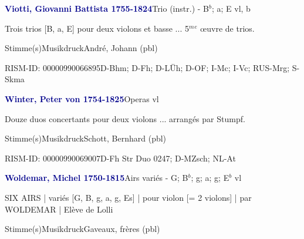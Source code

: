 \documentclass[twocolumn]{book}
\begin{document}
\par \vspace{7pt} \textcolor{darkblue}{\textbf{Viotti, Giovanni Battista  1755-1824}}\hfillplus{\textbf{[340]}}\newline Trio (instr.) - B$^b$; a; E vl, b
\par \begin{itshape}Trois trios [B, a, E] pour deux violons et basse ... 5$^m$$^e$ œuvre de trios.\end{itshape} 
\par \textcolor{darkblue}{}  Stimme(s)\newline Musikdruck\newline André, Johann  (pbl)
\par RISM-ID: 00000990066895\newline D-Bhm; D-Fh; D-LÜh; D-OF; I-Mc; I-Vc; RUS-Mrg; S-Skma
\par \vspace{7pt} \textcolor{darkblue}{\textbf{Winter, Peter von  1754-1825}}\hfillplus{\textbf{[341]}}\newline Operas vl
\par \begin{itshape}Douze duos concertants pour deux violons ... arrangés par Stumpf.\end{itshape} 
\par \textcolor{darkblue}{}  Stimme(s)\newline Musikdruck\newline Schott, Bernhard  (pbl)
\par RISM-ID: 00000990069007\newline D-Fh  Str Duo 0247; D-MZsch; NL-At
\par \vspace{7pt} \textcolor{darkblue}{\textbf{Woldemar, Michel  1750-1815}}\hfillplus{\textbf{[342]}}\newline Airs variés - G; B$^b$; g; a; g; E$^b$ vl
\par \begin{itshape}SIX AIRS | variés [G, B, g, a, g, Es] | pour violon [= 2 violons] | par WOLDEMAR | Elève de Lolli\end{itshape} 
\par \textcolor{darkblue}{}  Stimme(s)\newline Musikdruck\newline Gaveaux, frères  (pbl)
\end{document}
